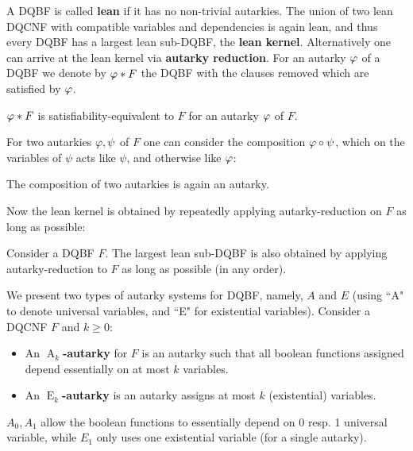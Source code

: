 \documentclass[conference]{IEEEtran}
\DeclareMathOperator{\Aaut}{A}
\DeclareMathOperator{\Eaut}{E}
\begin{document}
A DQBF is called \textbf{lean} if it has no non-trivial autarkies.
The union of two lean DQCNF with compatible variables and dependencies is again lean, and thus every DQBF has a largest lean sub-DQBF, the \textbf{lean kernel}.
Alternatively one can arrive at the lean kernel via \textbf{autarky reduction}.
For an autarky $\varphi$ of a DQBF we denote by $\varphi * F$ the DQBF with the clauses removed which are satisfied by $\varphi$.
\begin{lem}\label{lem:autsateq}
	$\varphi * F$ is satisfiability-equivalent to $F$ for an autarky $\varphi$ of $F$.
\end{lem}
For two autarkies $\varphi, \psi$ of $F$ one can consider the composition $\varphi \circ \psi$, which on the variables of $\psi$ acts like $\psi$, and otherwise like $\varphi$:
\begin{lem}\label{lem:compaut}
	The composition of two autarkies is again an autarky.
\end{lem}
Now the lean kernel is obtained by repeatedly applying autarky-reduction on $F$ as long as possible:
\begin{lem}\label{lem:decomp}
	Consider a DQBF $F$. The largest lean sub-DQBF is also obtained by applying autarky-reduction to $F$ as long as possible (in any order).
\end{lem}

We present two types of autarky systems for DQBF, namely, $A$ and $E$ (using ``A" to denote universal variables, and ``E" for existential variables).
%
Consider a DQCNF $F$ and $k \ge 0$:
\begin{itemize}
	\item An \textbf{$\Aaut_k$-autarky} for $F$ is an autarky such that all boolean functions assigned depend essentially on at most $k$ variables.
	\item An \textbf{$\Eaut_k$-autarky} is an autarky assigns at most $k$ (existential) variables.
\end{itemize}

$A_0, A_1$ allow the boolean functions to essentially depend on 0 resp. 1 universal variable, while $E_1$ only uses one existential variable (for a single autarky).
%
\end{document}
